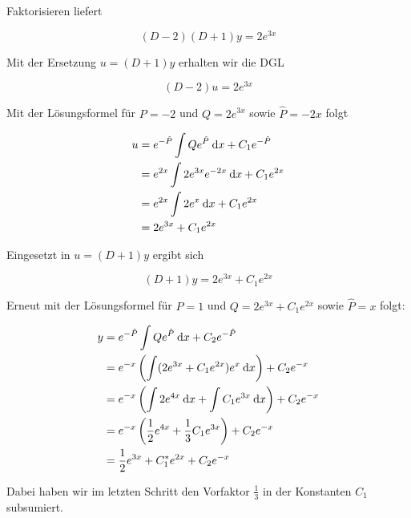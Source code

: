 \item Faktorisieren liefert

$$
	(D-2)(D+1) y = 2 e^{3x}
$$

Mit der Ersetzung $u = (D+1) y$ erhalten wir die DGL

$$
	(D-2)u = 2 e^{3x}
$$

Mit der Lösungsformel für $P=-2$ und $Q=2 e^{3x}$ sowie $\hat{P} = -2x$ folgt

\begin{alignat*}{2}
	u &=  e^{-\hat{P}} \int Q e^{\hat{P}} \:\mathrm{d}{x} + C_1 e^{-\hat{P}} \\
	  &= e^{2x} \int 2e^{3x} e^{-2x} \:\mathrm{d}{x} + C_1 e^{2x} \\
	  &= e^{2x} \int 2e^{x} \:\mathrm{d}{x} + C_1 e^{2x} \\
	  &= 2e^{3x} + C_1 e^{2x}
\end{alignat*}

Eingesetzt in $u = (D+1) y$ ergibt sich

$$
	(D+1) y = 2e^{3x} + C_1 e^{2x}
$$

Erneut mit der Lösungsformel für $P=1$ und $Q=2e^{3x} + C_1 e^{2x}$ sowie $\hat{P} = x$ folgt:

\begin{alignat*}{2}
	y &=  e^{-\hat{P}} \int Q e^{\hat{P}} \:\mathrm{d}{x} + C_2 e^{-\hat{P}} \\
	  &= e^{-x} \left( \int (2e^{3x} + C_1 e^{2x}) e^{x} \:\mathrm{d}{x} \right ) + C_2 e^{-x} \\
	  &= e^{-x} \left( \int 2e^{4x} \:\mathrm{d}{x} + \int C_1 e^{3x} \:\mathrm{d}{x}\right) + C_2 e^{-x} \\
	  &= e^{-x} \left( \frac{1}{2} e^{4x} + \frac{1}{3}C_1 e^{3x} \right ) + C_2 e^{-x} \\
	  &= \frac{1}{2} e^{3x} + C_1^* e^{2x} + C_2 e^{-x}
\end{alignat*}

Dabei haben wir im letzten Schritt den Vorfaktor $\frac{1}{3}$ in der Konstanten $C_1$ subsumiert.
